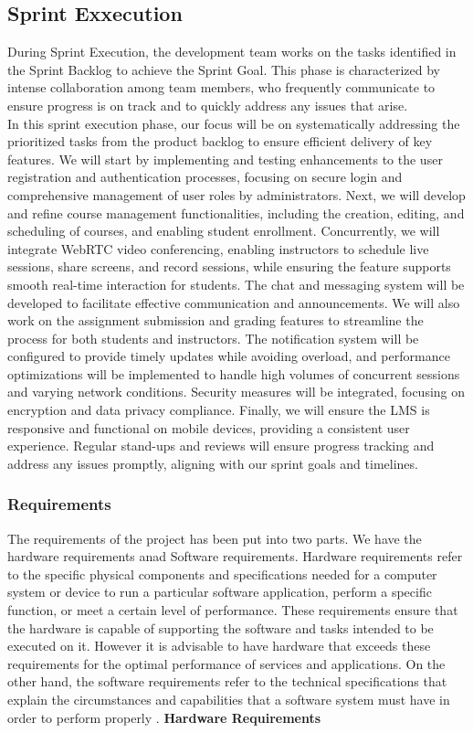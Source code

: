 \documentclass[a4paper,12pt]{article}  %
\begin{document}
\subsection{Sprint Exxecution}
During Sprint Execution, the development team works on the tasks identified in
the Sprint Backlog to achieve the Sprint Goal. This phase is characterized by
intense collaboration among team members, who frequently communicate to ensure
progress is on track and to quickly address any issues that
arise.\cite{beck2001agile}\\ In this sprint execution phase, our focus will be
on systematically addressing the prioritized tasks from the product backlog to
ensure efficient delivery of key features. We will start by implementing and
testing enhancements to the user registration and authentication processes,
focusing on secure login and comprehensive management of user roles by
administrators. Next, we will develop and refine course management
functionalities, including the creation, editing, and scheduling of courses,
and enabling student enrollment. Concurrently, we will integrate WebRTC video
conferencing, enabling instructors to schedule live sessions, share screens,
and record sessions, while ensuring the feature supports smooth real-time
interaction for students. The chat and messaging system will be developed to
facilitate effective communication and announcements. We will also work on the
assignment submission and grading features to streamline the process for both
students and instructors. The notification system will be configured to provide
timely updates while avoiding overload, and performance optimizations will be
implemented to handle high volumes of concurrent sessions and varying network
conditions. Security measures will be integrated, focusing on encryption and
data privacy compliance. Finally, we will ensure the LMS is responsive and
functional on mobile devices, providing a consistent user experience. Regular
stand-ups and reviews will ensure progress tracking and address any issues
promptly, aligning with our sprint goals and timelines.

\subsubsection{Requirements}
The requirements of the project has been put into two parts. We have the hardware requirements anad Software requirements. Hardware requirements refer to the specific physical components and specifications needed for a computer system or device to run a particular software application, perform a specific function, or meet a certain level of performance. These requirements ensure that the hardware is capable of supporting the software and tasks intended to be executed on it. However it is advisable to have hardware that exceeds these requirements for the optimal performance of services and applications\cite{HANNIFIN201017}. On the other hand, the software requirements refer to the technical specifications that explain the circumstances and capabilities that a software system must have in order to perform properly \cite{geeksforgeeks2024}.
\clearpage
\textbf{Hardware Requirements}\\
\end{document}
